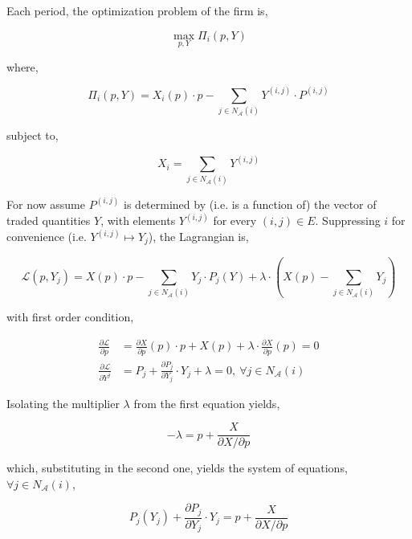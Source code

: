 \documentclass[american]{scrartcl}
\begin{document}
Each period, the optimization problem of the firm is,

\begin{equation}
	\max_{p, Y} \Pi_i(p, Y)
\end{equation}

where,

\begin{equation}
	\Pi_i\left(p, Y\right) = X_i(p) \cdot p - \sum_{j \in N_{\mathcal{A}}(i)} Y^{(i, j)} \cdot P^{(i, j)}
\end{equation}

subject to,

\begin{equation}
	X_i=  \sum_{j \in N_{\mathcal{A}}(i)} Y^{(i, j)}
\end{equation}

For now assume $P^{(i, j)}$ is determined by (i.e. is a function of) the vector of traded quantities $Y$, with elements $Y^{(i, j)}$ for every $(i, j) \in E$. Suppressing $i$ for convenience (i.e. $Y^{(i, j)} \mapsto Y_j$), the Lagrangian is,

\begin{equation}
	\mathcal{L}\left(p, Y_j\right) = X(p) \cdot p - \sum_{j \in N_{\mathcal{A}}(i)} Y_j \cdot P_j (Y) + \lambda\cdot \left(X(p) - \sum_{j \in N_{\mathcal{A}}(i)} Y_j\right)
\end{equation}

with first order condition,

\begin{equation}
	\begin{split}
		\frac{\partial \mathcal{L}}{\partial p}  &= \frac{\partial X}{\partial p}(p) \cdot p + X(p) + \lambda \cdot \frac{\partial X}{\partial p}(p) = 0 \\
		\frac{\partial \mathcal{L}}{\partial Y^j}  &= P_j + \frac{\partial P_j}{\partial Y_j} \cdot Y_j + \lambda =0, \ \forall j \in N_{\mathcal{A}}(i)
	\end{split}
\end{equation}

Isolating the multiplier $\lambda$ from the first equation yields,

\begin{equation}
	- \lambda = p + \frac{X}{\partial X / \partial p}
\end{equation}

which, substituting in the second one, yields the system of equations, $\forall j \in N_{\mathcal{A}}(i)$,

\begin{equation} \label{firm_optimization}
	P_j(Y_j) + \frac{\partial P_j}{\partial Y_j} \cdot Y_j = p + \frac{X}{\partial X / \partial p}
\end{equation}
\end{document}
